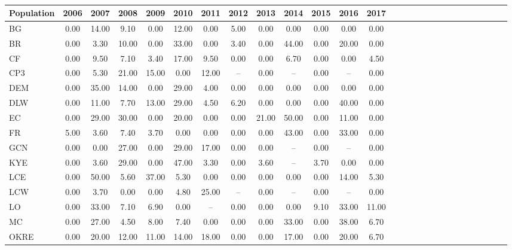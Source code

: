 \documentclass[12pt, oneside, titlepage]{article}   	%
\begin{document}
\newpage


  \label{tab:undercount} 
\centering
\
\begin{tabular*}{\textwidth}{ l @{\extracolsep{\fill}} *{26}{c} }
  \hline
  \hline
Population & 2006 & 2007 & 2008 & 2009 & 2010 & 2011 & 2012 & 2013 & 2014 & 2015 & 2016 & 2017 \\ 
  \hline
BG & 0.00 & 14.00 & 9.10 & 0.00 & 12.00 & 0.00 & 5.00 & 0.00 & 0.00 & 0.00 & 0.00 & 0.00 \\ 
  BR & 0.00 & 3.30 & 10.00 & 0.00 & 33.00 & 0.00 & 3.40 & 0.00 & 44.00 & 0.00 & 20.00 & 0.00 \\ 
  CF & 0.00 & 9.50 & 7.10 & 3.40 & 17.00 & 9.50 & 0.00 & 0.00 & 6.70 & 0.00 & 0.00 & 4.50 \\ 
  CP3 & 0.00 & 5.30 & 21.00 & 15.00 & 0.00 & 12.00 & -- & 0.00 & -- & 0.00 & -- & 0.00 \\ 
  DEM & 0.00 & 35.00 & 14.00 & 0.00 & 29.00 & 4.00 & 0.00 & 0.00 & 0.00 & 0.00 & 0.00 & 0.00 \\ 
  DLW & 0.00 & 11.00 & 7.70 & 13.00 & 29.00 & 4.50 & 6.20 & 0.00 & 0.00 & 0.00 & 40.00 & 0.00 \\ 
  EC & 0.00 & 29.00 & 30.00 & 0.00 & 20.00 & 0.00 & 0.00 & 21.00 & 50.00 & 0.00 & 11.00 & 0.00 \\ 
  FR & 5.00 & 3.60 & 7.40 & 3.70 & 0.00 & 0.00 & 0.00 & 0.00 & 43.00 & 0.00 & 33.00 & 0.00 \\ 
  GCN & 0.00 & 0.00 & 27.00 & 0.00 & 29.00 & 17.00 & 0.00 & 0.00 & -- & 0.00 & -- & 0.00 \\ 
  KYE & 0.00 & 3.60 & 29.00 & 0.00 & 47.00 & 3.30 & 0.00 & 3.60 & -- & 3.70 & 0.00 & 0.00 \\ 
  LCE & 0.00 & 50.00 & 5.60 & 37.00 & 5.30 & 0.00 & 0.00 & 0.00 & 0.00 & 0.00 & 14.00 & 5.30 \\ 
  LCW & 0.00 & 3.70 & 0.00 & 0.00 & 4.80 & 25.00 & -- & 0.00 & -- & 0.00 & -- & 0.00 \\ 
  LO & 0.00 & 33.00 & 7.10 & 6.90 & 0.00 & -- & 0.00 & 0.00 & 0.00 & 9.10 & 33.00 & 11.00 \\ 
  MC & 0.00 & 27.00 & 4.50 & 8.00 & 7.40 & 0.00 & 0.00 & 0.00 & 33.00 & 0.00 & 38.00 & 6.70 \\ 
  OKRE & 0.00 & 20.00 & 12.00 & 11.00 & 14.00 & 18.00 & 0.00 & 0.00 & 17.00 & 0.00 & 20.00 & 6.70 \\ 

\end{tabular*}
\end{document}
